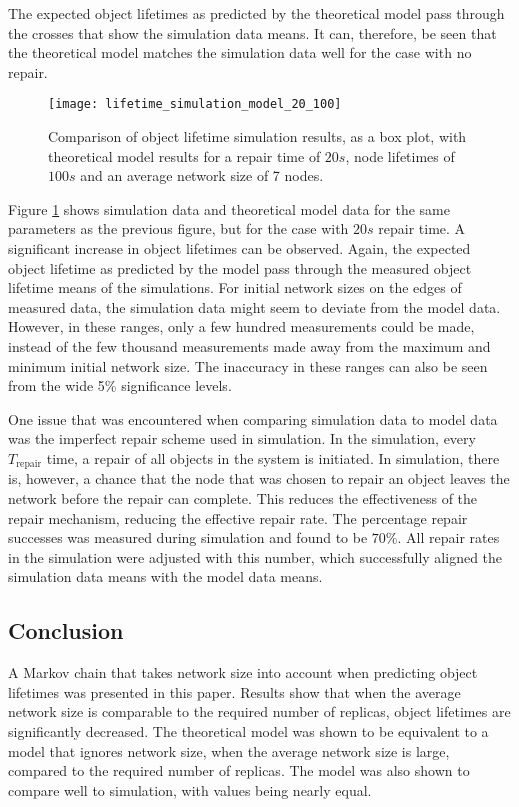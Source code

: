 The expected object lifetimes as predicted by the theoretical model pass through the crosses that show the simulation data means. It can, therefore, be seen that the theoretical model matches the simulation data well for the case with no repair.

\begin{figure}[htbp]
 \centering
 \texttt{[image: lifetime\_simulation\_model\_20\_100]}
 \caption{Comparison of object lifetime simulation results, as a box plot, with theoretical model results for a repair time of $20 s$, node lifetimes of $100 s$ and an average network size of 7 nodes.}
 \label{fig_lifetime_simulation_model_20_100}
\end{figure}
%
Figure \ref{fig_lifetime_simulation_model_20_100} shows simulation data and theoretical model data for the same parameters as the previous figure, but for the case with $20 s$ repair time. A significant increase in object lifetimes can be observed. Again, the expected object lifetime as predicted by the model pass through the measured object lifetime means of the simulations. For initial network sizes on the edges of measured data, the simulation data might seem to deviate from the model data. However, in these ranges, only a few hundred measurements could be made, instead of the few thousand measurements made away from the maximum and minimum initial network size. The inaccuracy in these ranges can also be seen from the wide 5\% significance levels.

One issue that was encountered when comparing simulation data to model data was the imperfect repair scheme used in simulation. In the simulation, every $T_{\textrm{repair}}$ time, a repair of all objects in the system is initiated. In simulation, there is, however, a chance that the node that was chosen to repair an object leaves the network before the repair can complete. This reduces the effectiveness of the repair mechanism, reducing the effective repair rate. The percentage repair successes was measured during simulation and found to be $70 \%$. All repair rates in the simulation were adjusted with this number, which successfully aligned the simulation data means with the model data means.

\subsection{Conclusion}
\label{conclusion}

A Markov chain that takes network size into account when predicting object lifetimes was presented in this paper. Results show that when the average network size is comparable to the required number of replicas, object lifetimes are significantly decreased. The theoretical model was shown to be equivalent to a model that ignores network size, when the average network size is large, compared to the required number of replicas. The model was also shown to compare well to simulation, with values being nearly equal.

